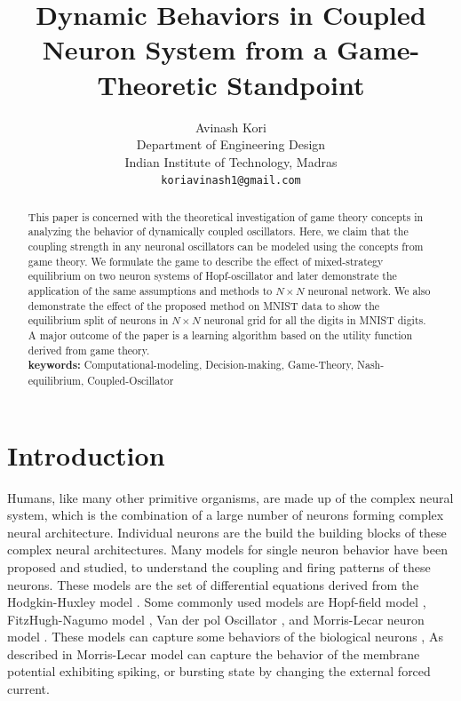 \documentclass{article}
\title{Dynamic Behaviors in Coupled Neuron System from a Game-Theoretic Standpoint}
\author{%
  Avinash Kori\\
  Department of Engineering Design\\
  Indian Institute of Technology, Madras\\
  \texttt{koriavinash1@gmail.com} \\
}
\begin{document}
\maketitle

\begin{abstract}
This paper is concerned with the theoretical investigation of game theory concepts in analyzing the behavior of dynamically coupled oscillators. Here, we claim that the coupling strength in any neuronal oscillators can be modeled using the concepts from game theory. We formulate the game to describe the effect of mixed-strategy equilibrium on two neuron systems of Hopf-oscillator and later demonstrate the application of the same assumptions and methods to $N \times N$ neuronal network. We also demonstrate the effect of the proposed method on MNIST data to show the equilibrium split of neurons in $N \times N$ neuronal grid for all the digits in MNIST digits. A major outcome of the paper is a learning algorithm based on the utility function derived from game theory.
\\

\textbf{keywords: } {Computational-modeling, Decision-making, Game-Theory, Nash-equilibrium, Coupled-Oscillator}

\end{abstract}

\section{Introduction}
Humans, like many other primitive organisms, are made up of the complex neural system, which is the combination of a large number of neurons forming complex neural architecture. Individual neurons are the build the building blocks of these complex neural architectures. Many models for single neuron behavior have been proposed and studied, to understand the coupling and firing patterns of these neurons. These models are the set of differential equations derived from the Hodgkin-Huxley model \cite{hodgkin1952dual}. Some commonly used models are Hopf-field model \cite{wang2003hopf}, FitzHugh-Nagumo model \cite{fitzhugh1961impulses}, Van der pol Oscillator \cite{parlitz1987period}, and Morris-Lecar neuron model \cite{morris1981voltage}. These models can capture some behaviors of the biological neurons \cite{gu2001integer, koper1996experimental, gu2013experimental}, As described in \cite{tsumoto2006bifurcations} Morris-Lecar model can capture the behavior of the membrane potential exhibiting spiking, or bursting state by changing the external forced current. 
\end{document}
